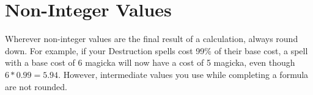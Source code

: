 \section{Non-Integer Values}
Wherever non-integer values are the final result of a calculation, always round down. For example, if your Destruction spells cost 99\% of their base cost, a spell with a base cost of 6 magicka will now have a cost of 5 magicka, even though $6*0.99=5.94$. However, intermediate values you use while completing a formula are not rounded.